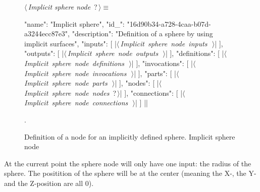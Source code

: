 \documentclass[%
    a4paper,    %
    justified,  %
    nobib,      %
    openany     %
]{tufte-book}
\begin{document}
\begin{figure}
\begin{flushleft} \small
\begin{minipage}{\linewidth}\label{scrap99}\raggedright\small
{} $\langle\,${\itshape Implicit sphere node}\nobreak\ {\footnotesize {?}}$\,\rangle\equiv$
\vspace{-1ex}
\begin{pythoncode}
{
    "name": "Implicit sphere",
    "id_": "16d90b34-a728-4caa-b07d-a3244ecc87e3",
    "description": "Definition of a sphere by using implicit surfaces",
    "inputs": [
        |\hbox{$\langle\,${\itshape Implicit sphere node inputs}\nobreak\ {\footnotesize {}}$\,\rangle$}|
    ],
    "outputs": [
        |\hbox{$\langle\,${\itshape Implicit sphere node outputs}\nobreak\ {\footnotesize {}}$\,\rangle$}|
    ],
    "definitions": [
        |\hbox{$\langle\,${\itshape Implicit sphere node definitions}\nobreak\ {\footnotesize {}}$\,\rangle$}|
    ],
    "invocations": [
        |\hbox{$\langle\,${\itshape Implicit sphere node invocations}\nobreak\ {\footnotesize {}}$\,\rangle$}|
    ],
    "parts": [
        |\hbox{$\langle\,${\itshape Implicit sphere node parts}\nobreak\ {\footnotesize {}}$\,\rangle$}|
    ],
    "nodes": [
        |\hbox{$\langle\,${\itshape Implicit sphere node nodes}\nobreak\ {\footnotesize ?}$\,\rangle$}|
    ],
    "connections": [
        |\hbox{$\langle\,${\itshape Implicit sphere node connections}\nobreak\ {\footnotesize {}}$\,\rangle$}|
    ]
}|\NWsep|
\end{pythoncode}
\vspace{1.5ex}
\footnotesize
\begin{list}{}{\setlength{\itemsep}{-\parsep}\setlength{\itemindent}{-\leftmargin}}
\item {\NWtxtMacroNoRef}.

\item{}
\end{list}
\end{minipage}\vspace{4ex}
\end{flushleft}
\caption{Definition of a node for an implicitly defined sphere.
  \newline{}\newline{}Implicit sphere node}
\label{editor:lst:nodes:sphere-node}
\end{figure}

At the current point the sphere node will only have one input: the radius of
the sphere. The positition of the sphere will be at the center (meaning the
X-, the Y- and the Z-position are all 0).
\end{document}
